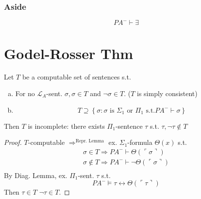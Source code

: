 \documentclass[12pt]{article}
\newcommand{\proves}{\vdash}
\newcommand{\gn}[1]{\ulcorner #1 \urcorner}
\begin{document}
\subsubsection*{Aside}
\[
PA^- \proves \exists
\]

\section*{Godel-Rosser Thm}
Let $T$ be a computable set of sentences s.t.
\begin{enumerate}[(a)]
  \item For no $\mathcal{L}_A$-sent. $\sigma, \sigma \in T$ and $\neg\sigma \in T$. ($T$ is simply consistent)
  \item 
    \[
T \supseteq \left\{ \sigma : \sigma \text{ is $\Sigma_1$ or $\Pi_1$ s.t.} PA^- \proves \sigma  \right\}
    \]
\end{enumerate}
Then $T$ is incomplete: there exists $\Pi_1$-sentence $\tau$ s.t.
$\tau, \neg \tau \not\in T$

\begin{proof}
  $T$-computable  $\Rightarrow^\text{Repr. Lemma}$ ex. $\Sigma_1$-formula
  $\Theta(x)$ s.t.
\begin{align*}
  \sigma \in T \Rightarrow PA^- \proves \Theta(\gn{\sigma}) \\
  \sigma \not\in T \Rightarrow PA^- \proves \neg \Theta(\gn{\sigma}) \\
\end{align*}
By Diag. Lemma, ex. $\Pi_1$-sent. $\tau$ s.t.
\[
PA^- \models \tau \leftrightarrow \Theta( \gn{\tau})
\]
Then $\tau \in T$
$\neg \tau \in T$.
\end{proof}
\end{document}
